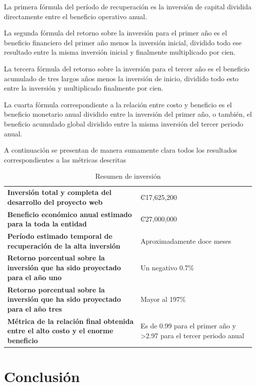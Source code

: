 \documentclass[11pt,spanish]{article}
\begin{document}
La primera fórmula del período de recuperación es la inversión de capital dividida directamente entre el beneficio operativo anual.

La segunda fórmula del retorno sobre la inversión para el primer año es el beneficio financiero del primer año menos la inversión inicial, dividido todo ese resultado entre la misma inversión inicial y finalmente multiplicado por cien.

La tercera fórmula del retorno sobre la inversión para el tercer año es el beneficio acumulado de tres largos años menos la inversión de inicio, dividido todo esto entre la inversión y multiplicado finalmente por cien.

La cuarta fórmula correspondiente a la relación entre costo y beneficio es el beneficio monetario anual dividido entre la inversión del primer año, o también, el beneficio acumulado global dividido entre la misma inversión del tercer periodo anual.

A continuación se presentan de manera sumamente clara todos los resultados correspondientes a las métricas descritas

\begin{table}[H]
\centering
\small
\caption{Resumen de inversión}\label{tab:resumen-inversion}
\begin{tabularx}{\textwidth}{Y p{5.2cm}}
\toprule
\textbf{Inversión total y completa del desarrollo del proyecto web} & ₡17,625,200 \\
\textbf{Beneficio económico anual estimado para la toda la entidad} & ₡27,000,000 \\
\textbf{Período estimado temporal de recuperación de la alta inversión} & Aproximadamente doce meses \\
\textbf{Retorno porcentual sobre la inversión que ha sido proyectado para el año uno} & Un negativo 0.7\% \\
\textbf{Retorno porcentual sobre la inversión que ha sido proyectado para el año tres} & Mayor al 197\% \\
\textbf{Métrica de la relación final obtenida entre el alto costo y el enorme beneficio} & Es de 0.99 para el primer año y \textgreater{}2.97 para el tercer periodo anual \\
\bottomrule
\end{tabularx}
\end{table}

\section{Conclusión}
\end{document}
